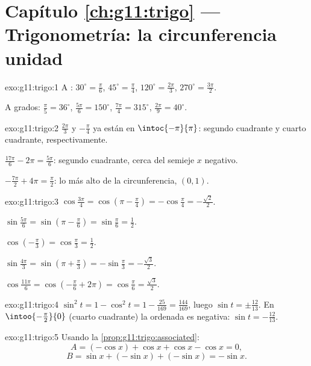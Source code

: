 \section*{Capítulo \ref{ch:g11:trigo} --- Trigonometría: la circunferencia unidad}

\begin{solution}{exo:g11:trigo:1}
A : $30^\circ = \frac{\pi}{6}$, $45^\circ = \frac{\pi}{4}$,
$120^\circ = \frac{2\pi}{3}$, $270^\circ = \frac{3\pi}{2}$.

A grados: $\frac{\pi}{5} = 36^\circ$, $\frac{5\pi}{6} = 150^\circ$,
$\frac{7\pi}{4} = 315^\circ$, $\frac{2\pi}{9} = 40^\circ$.
\end{solution}

\begin{solution}{exo:g11:trigo:2}
$\frac{2\pi}{3}$ y $-\frac{\pi}{4}$ ya están en $\intoc{-\pi}{\pi}$:
segundo cuadrante y cuarto cuadrante, respectivamente.

$\frac{17\pi}{6} - 2\pi = \frac{5\pi}{6}$: segundo cuadrante, cerca del
semieje $x$ negativo.

$-\frac{7\pi}{2} + 4\pi = \frac{\pi}{2}$: lo más alto de la
circunferencia, $(0, 1)$.
\end{solution}

\begin{solution}{exo:g11:trigo:3}
$\cos\frac{3\pi}{4} = \cos\left(\pi - \frac\pi4\right)
= -\cos\frac\pi4 = -\frac{\sqrt2}{2}$.

$\sin\frac{5\pi}{6} = \sin\left(\pi - \frac\pi6\right)
= \sin\frac\pi6 = \frac12$.

$\cos\left(-\frac\pi3\right) = \cos\frac\pi3 = \frac12$.

$\sin\frac{4\pi}{3} = \sin\left(\pi + \frac\pi3\right)
= -\sin\frac\pi3 = -\frac{\sqrt3}{2}$.

$\cos\frac{11\pi}{6} = \cos\left(-\frac\pi6 + 2\pi\right)
= \cos\frac\pi6 = \frac{\sqrt3}{2}$.
\end{solution}

\begin{solution}{exo:g11:trigo:4}
$\sin^2 t = 1 - \cos^2 t = 1 - \frac{25}{169} = \frac{144}{169}$, luego
$\sin t = \pm\frac{12}{13}$. En $\intoo{-\frac\pi2}{0}$ (cuarto
cuadrante) la ordenada es negativa: $\sin t = -\frac{12}{13}$.
\end{solution}

\begin{solution}{exo:g11:trigo:5}
Usando la \cref{prop:g11:trigo:associated}:
\[
A = (-\cos x) + \cos x + \cos x - \cos x = 0 ,
\]
\[
B = \sin x + (-\sin x) + (-\sin x) = -\sin x .
\]
\end{solution}

